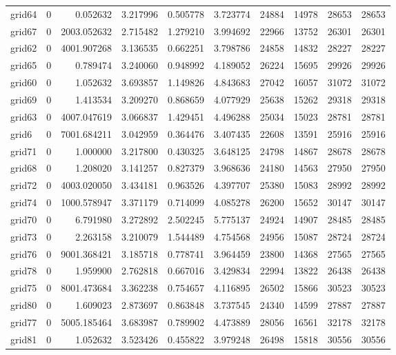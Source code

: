\begin{longtable}{|l|r|r|r|r|r|r|r|r|r|}
grid64 & 0 & 0.052632 & 3.217996 & 0.505778 & 3.723774 & 24884 & 14978 & 28653 & 28653 \\
grid67 & 0 & 2003.052632 & 2.715482 & 1.279210 & 3.994692 & 22966 & 13752 & 26301 & 26301 \\
grid62 & 0 & 4001.907268 & 3.136535 & 0.662251 & 3.798786 & 24858 & 14832 & 28227 & 28227 \\
grid65 & 0 & 0.789474 & 3.240060 & 0.948992 & 4.189052 & 26224 & 15695 & 29926 & 29926 \\
grid60 & 0 & 1.052632 & 3.693857 & 1.149826 & 4.843683 & 27042 & 16057 & 31072 & 31072 \\
grid69 & 0 & 1.413534 & 3.209270 & 0.868659 & 4.077929 & 25638 & 15262 & 29318 & 29318 \\
grid63 & 0 & 4007.047619 & 3.066837 & 1.429451 & 4.496288 & 25034 & 15023 & 28781 & 28781 \\
grid6 & 0 & 7001.684211 & 3.042959 & 0.364476 & 3.407435 & 22608 & 13591 & 25916 & 25916 \\
grid71 & 0 & 1.000000 & 3.217800 & 0.430325 & 3.648125 & 24798 & 14867 & 28678 & 28678 \\
grid68 & 0 & 1.208020 & 3.141257 & 0.827379 & 3.968636 & 24180 & 14563 & 27950 & 27950 \\
grid72 & 0 & 4003.020050 & 3.434181 & 0.963526 & 4.397707 & 25380 & 15083 & 28992 & 28992 \\
grid74 & 0 & 1000.578947 & 3.371179 & 0.714099 & 4.085278 & 26200 & 15652 & 30147 & 30147 \\
grid70 & 0 & 6.791980 & 3.272892 & 2.502245 & 5.775137 & 24924 & 14907 & 28485 & 28485 \\
grid73 & 0 & 2.263158 & 3.210079 & 1.544489 & 4.754568 & 24956 & 15087 & 28724 & 28724 \\
grid76 & 0 & 9001.368421 & 3.185718 & 0.778741 & 3.964459 & 23800 & 14368 & 27565 & 27565 \\
grid78 & 0 & 1.959900 & 2.762818 & 0.667016 & 3.429834 & 22994 & 13822 & 26438 & 26438 \\
grid75 & 0 & 8001.473684 & 3.362238 & 0.754657 & 4.116895 & 26502 & 15866 & 30523 & 30523 \\
grid80 & 0 & 1.609023 & 2.873697 & 0.863848 & 3.737545 & 24340 & 14599 & 27887 & 27887 \\
grid77 & 0 & 5005.185464 & 3.683987 & 0.789902 & 4.473889 & 28056 & 16561 & 32178 & 32178 \\
grid81 & 0 & 1.052632 & 3.523426 & 0.455822 & 3.979248 & 26498 & 15818 & 30556 & 30556 \\

\end{longtable}
